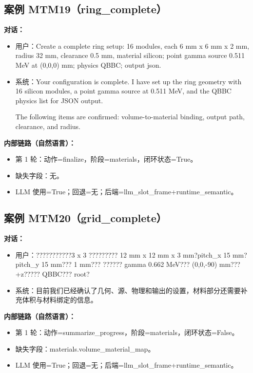 \documentclass[11pt]{ctexart}
\begin{document}
\subsection{案例 MTM19（ring\_complete）}
\textbf{对话：}
\begin{itemize}
\item 用户：Create a complete ring setup: 16 modules, each 6 mm x 6 mm x 2 mm, radius 32 mm, clearance 0.5 mm, material silicon; point gamma source 0.511 MeV at (0,0,0) mm; physics QBBC; output json.
\item 系统：Your configuration is complete. I have set up the ring geometry with 16 silicon modules, a point gamma source at 0.511 MeV, and the QBBC physics list for JSON output.

The following items are confirmed: volume-to-material binding, output path, clearance, and radius.
\end{itemize}
\textbf{内部链路（自然语言）：}
\begin{itemize}
\item 第 1 轮：动作=finalize，阶段=materials，闭环状态=True。
\item 缺失字段：无。
\item LLM 使用=True；回退=无；后端=llm\_slot\_frame+runtime\_semantic。
\end{itemize}
\subsection{案例 MTM20（grid\_complete）}
\textbf{对话：}
\begin{itemize}
\item 用户：???????????3 x 3 ????????? 12 mm x 12 mm x 3 mm?pitch\_x 15 mm?pitch\_y 15 mm??? 1 mm??? ?????? gamma 0.662 MeV??? (0,0,-90) mm??? +z????? QBBC??? root?
\item 系统：目前我们已经确认了几何、源、物理和输出的设置，材料部分还需要补充体积与材料绑定的信息。
\end{itemize}
\textbf{内部链路（自然语言）：}
\begin{itemize}
\item 第 1 轮：动作=summarize\_progress，阶段=materials，闭环状态=False。
\item 缺失字段：materials.volume\_material\_map。
\item LLM 使用=True；回退=无；后端=llm\_slot\_frame+runtime\_semantic。
\end{itemize}
\end{document}
